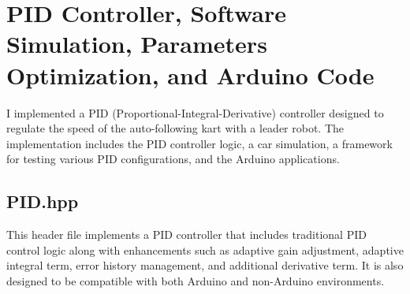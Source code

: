 \documentclass[a4paper,12pt]{report}
\begin{document}
\section{PID Controller, Software Simulation, Parameters Optimization, and Arduino Code}
I implemented a PID (Proportional-Integral-Derivative) controller designed to regulate the speed of the auto-following kart with a leader robot. The implementation includes the PID controller logic, a car simulation, a framework for testing various PID configurations, and the Arduino applications.
\subsection{PID.hpp}
This header file implements a PID controller that includes traditional PID control logic along with enhancements such as adaptive gain adjustment, adaptive integral term, error history management, and additional derivative term. It is also designed to be compatible with both Arduino and non-Arduino environments.
\end{document}
